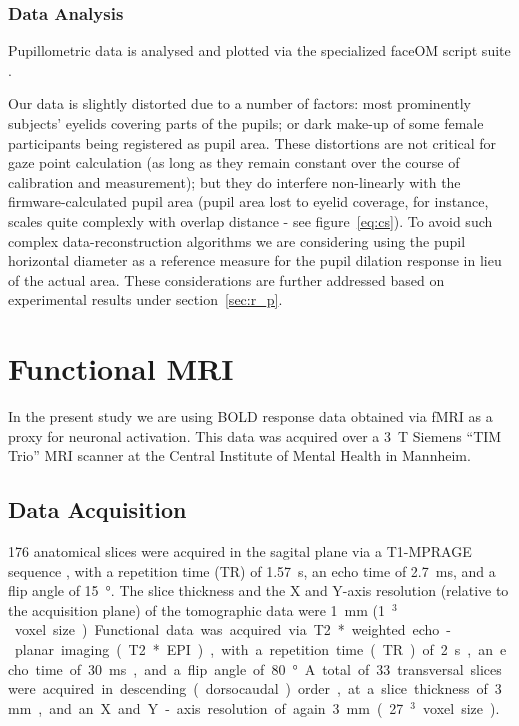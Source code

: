 	    \subsubsection{Data Analysis}
		Pupillometric data is analysed and plotted via the specialized faceOM script suite \citep{faceOM}.
		
		Our data is slightly distorted due to a number of factors: most prominently subjects' eyelids covering parts of the pupils; or dark make-up of some female participants being registered as pupil area.
		These distortions are not critical for gaze point calculation (as long as they remain constant over the course of calibration and measurement); 
		but they do interfere non-linearly with the firmware-calculated pupil area 
		(pupil area lost to eyelid coverage, for instance, scales quite complexly with overlap distance - see figure~\ref{eq:cs}).
		To avoid such complex data-reconstruction algorithms we are considering using the pupil horizontal diameter as a reference measure for the pupil dilation response in lieu of the actual area.
		These considerations are further addressed based on experimental results under section~\ref{sec:r_p}.
	    
    \section{Functional MRI}\label{sec:m_fmri}
	In the present study we are using BOLD response data obtained via fMRI as a proxy for neuronal activation.
	This data was acquired over a \SI{3}{\tesla} Siemens “TIM Trio” MRI scanner at the Central Institute of Mental Health in Mannheim.
	\subsection{Data Acquisition}
	    176 anatomical slices were acquired in the sagital plane via a T1-MPRAGE sequence \citep{Brant-Zawadzki1992}, with a repetition time (TR) of \SI{1.57}{\second}, an echo time of \SI{2.7}{\milli\second}, and a flip angle of \SI{15}{\degree}.
	    The slice thickness and the X and Y-axis resolution (relative to the acquisition plane) of the tomographic data were \SI{1}{\milli\metre} (\SI{1}{\milli\metre$^3$} voxel size).
	    
	    Functional data was acquired via T2* weighted echo-planar imaging (T2* EPI), with a repetition time (TR) of \SI{2}{\second}, an echo time of \SI{30}{\milli\second}, and a flip angle of \SI{80}{\degree}.
	    A total of 33 transversal slices were acquired in descending (dorsocaudal) order, at a slice thickness of \SI{3}{\milli\metre}, and an X and Y-axis resolution of again \SI{3}{\milli\metre} (\SI{27}{\milli\metre$^3$} voxel size).

